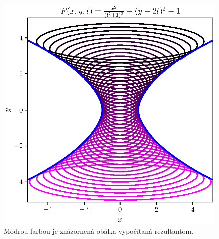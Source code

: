 \begin{figure}[h]
	\centering
	\includegraphics{images/resultant.eps}
	\caption[Obálka nájdená rezultantom.]{Modrou farbou je znázornená obálka vypočítaná rezultantom.}
	\label{fig:resultant}
\end{figure}


